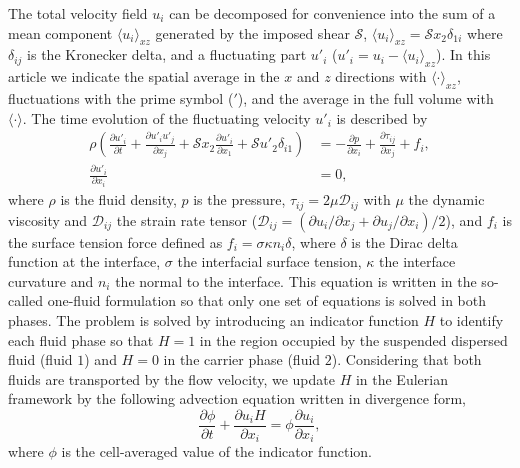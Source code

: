 The total velocity field $u_i$ can be decomposed for convenience into the sum of a mean component $\langle u_i \rangle_{xz}$ generated by the imposed shear $\mathcal{S}$, \ie $\langle u_i \rangle_{xz}=\mathcal{S}x_2 \delta_{1i}$ where $\delta_{ij}$ is the Kronecker delta, and a fluctuating part $u'_i $ ($u'_i = u_i - \langle u_i \rangle_{xz}$). In this article we indicate the spatial average in the $x$ and $z$ directions with $\langle \cdot \rangle_{xz}$, fluctuations with the prime symbol ($'$), and the average in the full volume with $\langle \cdot \rangle$. The time evolution of the fluctuating velocity $u'_i$ is described by
\begin{align}
\label{eq:NS}
\rho \left( \frac{\partial u'_i}{\partial t} + \frac{\partial u'_i u'_j}{\partial x_j} + \mathcal{S} x_2 \frac{\partial u'_i}{\partial x_1} + \mathcal{S} u'_2 \delta_{i1} \right)  &= - \frac{\partial p}{\partial x_i} + \frac{\partial \tau_{ij}}{\partial x_j} + f_i, \\
\frac{\partial u'_i}{\partial x_i} &= 0,
\end{align}
where $\rho$ is the fluid density, $p$ is the pressure, $\tau_{ij}= 2 \mu \mathcal{D}_{ij}$ with $\mu$ the dynamic viscosity and $\mathcal{D}_{ij}$ the strain rate tensor ($\mathcal{D}_{ij}= \left( \partial u_i/ \partial x_j + \partial u_j/\partial x_i \right)/2$), and $f_i$ is the surface tension force defined as $f_i=\sigma \kappa n_i \delta$, where $\delta$ is the Dirac delta function at the interface, $\sigma$ the interfacial surface tension, $\kappa$ the interface curvature and $n_i$ the normal to the interface. This equation is written in the so-called one-fluid formulation \citep{tryggvason_sussman_hussaini_2007a} so that only one set of equations is solved in both phases. The problem is solved by introducing an indicator function $H$ to identify each fluid phase so that $H = 1$ in the region occupied by the suspended dispersed fluid (fluid $1$) and $H = 0$ in the carrier phase (fluid $2$). Considering that both fluids are transported by the flow velocity, we update $H$ in the Eulerian framework by the following advection equation written in divergence form,
\begin{equation}
\frac{\partial \phi}{\partial t} + \frac{\partial u_i H}{\partial x_i} = \phi \frac{\partial u_i}{\partial x_i},
\end{equation}
where $\phi$ is the cell-averaged value of the indicator function.

